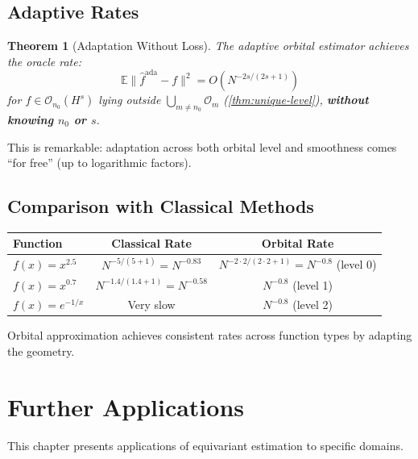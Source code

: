 \documentclass[11pt,twoside,openright]{book}
\theoremstyle{plain}
\newtheorem{theorem}{Theorem}[chapter]
\theoremstyle{definition}
\theoremstyle{remark}
\newcommand{\calO}{\mathcal{O}}
\newcommand{\norm}[1]{\|#1\|}
\newcommand{\E}{\mathbb{E}}
\begin{document}
\section{Adaptive Rates}

\begin{theorem}[Adaptation Without Loss]
\label{thm:adaptation-without-loss}
The adaptive orbital estimator achieves the oracle rate:
\begin{equation}
\E\norm{\hat{f}^{\text{ada}} - f}^2 = O\left(N^{-2s/(2s+1)}\right)
\label{eq:oracle-rate}
\end{equation}
for $f \in \calO_{n_0}(H^s)$ lying outside $\bigcup_{m\neq n_0}\calO_m$ (\cref{thm:unique-level}), \textbf{without knowing $n_0$ or $s$}.
\end{theorem}

This is remarkable: adaptation across both orbital level and smoothness comes ``for free'' (up to logarithmic factors).

\section{Comparison with Classical Methods}

\begin{center}
\begin{tabular}{lcc}
\toprule
Function & Classical Rate & Orbital Rate \\
\midrule
$f(x) = x^{2.5}$ & $N^{-5/(5+1)} = N^{-0.83}$ & $N^{-2 \cdot 2/(2 \cdot 2+1)} = N^{-0.8}$ (level 0) \\
$f(x) = x^{0.7}$ & $N^{-1.4/(1.4+1)} = N^{-0.58}$ & $N^{-0.8}$ (level 1) \\
$f(x) = e^{-1/x}$ & Very slow & $N^{-0.8}$ (level 2) \\
\bottomrule
\end{tabular}
\end{center}

Orbital approximation achieves consistent rates across function types by adapting the geometry.


\chapter{Further Applications}
\label{ch:further}

This chapter presents applications of equivariant estimation to specific domains.
\end{document}
